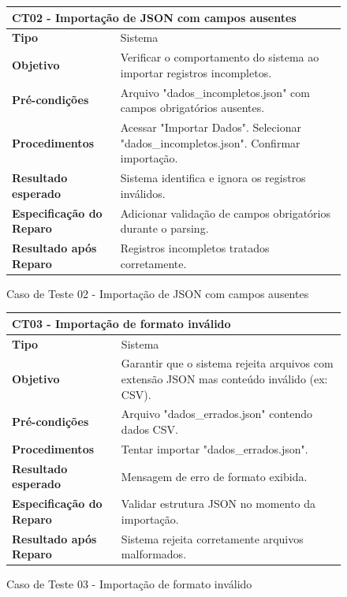\begin{figure}[H]
    \centering
\begin{longtable}{|p{}|p{}|}
\hline
\multicolumn{2}{|l|}{\textbf{CT02 - Importação de JSON com campos ausentes}} \\
\hline
\textbf{Tipo} & Sistema \\
\hline
\textbf{Objetivo} & Verificar o comportamento do sistema ao importar registros incompletos. \\
\hline
\textbf{Pré-condições} & Arquivo "dados\_incompletos.json" com campos obrigatórios ausentes. \\
\hline
\textbf{Procedimentos} & Acessar "Importar Dados". Selecionar "dados\_incompletos.json". Confirmar importação. \\
\hline
\textbf{Resultado esperado} & Sistema identifica e ignora os registros inválidos. \\
\hline
\textbf{Especificação do Reparo} & Adicionar validação de campos obrigatórios durante o parsing. \\
\hline
\textbf{Resultado após Reparo} & Registros incompletos tratados corretamente. \\
\hline
\end{longtable}
\caption{Caso de Teste 02 - Importação de JSON com campos ausentes}
\label{fig_ct02_importacao_json_campos_ausentes}
\end{figure}

\begin{figure}[H]
    \centering
\begin{longtable}{|p{}|p{}|}
\hline
\multicolumn{2}{|l|}{\textbf{CT03 - Importação de formato inválido}} \\
\hline
\textbf{Tipo} & Sistema \\
\hline
\textbf{Objetivo} & Garantir que o sistema rejeita arquivos com extensão JSON mas conteúdo inválido (ex: CSV). \\
\hline
\textbf{Pré-condições} & Arquivo "dados\_errados.json" contendo dados CSV. \\
\hline
\textbf{Procedimentos} & Tentar importar "dados\_errados.json". \\
\hline
\textbf{Resultado esperado} & Mensagem de erro de formato exibida. \\
\hline
\textbf{Especificação do Reparo} & Validar estrutura JSON no momento da importação. \\
\hline
\textbf{Resultado após Reparo} & Sistema rejeita corretamente arquivos malformados. \\
\hline
\end{longtable}
\caption{Caso de Teste 03 - Importação de formato inválido}
\label{fig_ct03_importacao_formato_invalido}
\end{figure}

